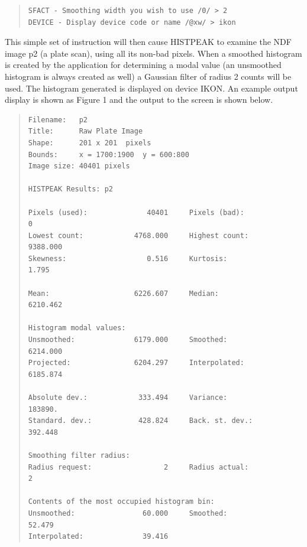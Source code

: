 \documentclass[twoside,11pt]{article}
\newenvironment{myquote}{\begin{quote}\begin{small}}{\end{small}\end{quote}}
\begin{document}
\begin{myquote}
\begin{verbatim}
SFACT - Smoothing width you wish to use /0/ > 2
DEVICE - Display device code or name /@xw/ > ikon
\end{verbatim}
\end{myquote}

This simple set of instruction will then cause HISTPEAK to examine the 
NDF image p2 (a plate scan), using all its non-bad pixels. When a smoothed 
histogram is created by the application for determining a modal value (an 
unsmoothed histogram is always
created as well) a Gaussian filter of radius 2 counts will be used. The 
histogram generated is displayed on device IKON. An example output display 
is shown as Figure 1 and the output to the screen is shown below.

\begin{myquote}
\begin{verbatim}
Filename:   p2
Title:      Raw Plate Image
Shape:      201 x 201  pixels
Bounds:     x = 1700:1900  y = 600:800
Image size: 40401 pixels

HISTPEAK Results: p2

Pixels (used):              40401     Pixels (bad):                0
Lowest count:            4768.000     Highest count:        9388.000
Skewness:                   0.516     Kurtosis:                1.795

Mean:                    6226.607     Median:               6210.462

Histogram modal values:
Unsmoothed:              6179.000     Smoothed:             6214.000
Projected:               6204.297     Interpolated:         6185.874

Absolute dev.:            333.494     Variance:              183890.
Standard. dev.:           428.824     Back. st. dev.:        392.448

Smoothing filter radius:
Radius request:                 2     Radius actual:               2

Contents of the most occupied histogram bin:
Unsmoothed:                60.000     Smoothed:               52.479
Interpolated:              39.416
\end{verbatim}
\end{myquote}
     
\end{document}
